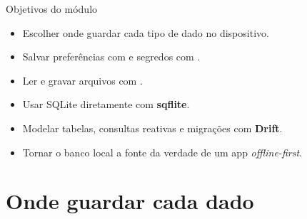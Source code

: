 \documentclass[aspectratio=169,10pt]{beamer}
\begin{document}
\capa

\begin{frame}{Objetivos do módulo}
  \begin{conceito}
    \begin{itemize}
      \item Escolher onde guardar cada tipo de dado no dispositivo.
      \item Salvar preferências com  e segredos com .
      \item Ler e gravar arquivos com .
      \item Usar SQLite diretamente com \textbf{sqflite}.
      \item Modelar tabelas, consultas reativas e migrações com \textbf{Drift}.
      \item Tornar o banco local a fonte da verdade de um app \emph{offline-first}.
    \end{itemize}
  \end{conceito}
\end{frame}

\sumario



\section{Onde guardar cada dado}
\end{document}
